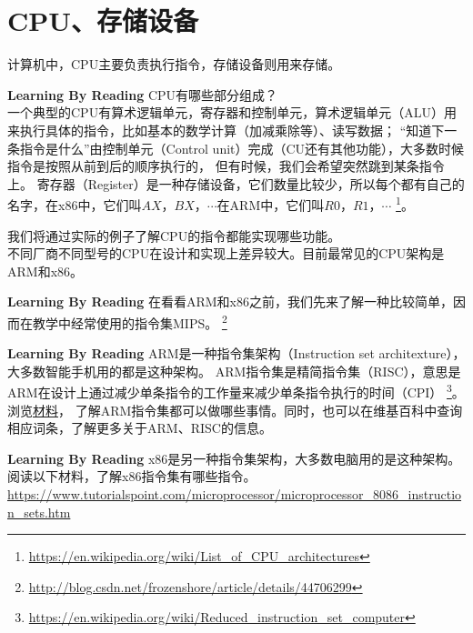 \section{CPU、存储设备}
计算机中，CPU主要负责执行指令，存储设备则用来存储。\\
\begin{paperbox}{\textbf{Learning By Reading}\starthree}
CPU有哪些部分组成？\\
一个典型的CPU有算术逻辑单元，寄存器和控制单元，算术逻辑单元（ALU）用来执行具体的指令，比如基本的数学计算（加减乘除等）、读写数据；
“知道下一条指令是什么”由控制单元（Control unit）完成（CU还有其他功能），大多数时候指令是按照从前到后的顺序执行的，
但有时候，我们会希望突然跳到某条指令上。
寄存器（Register）是一种存储设备，它们数量比较少，所以每个都有自己的名字，在x86中，它们叫$AX$，$BX$，$\cdots$在ARM中，它们叫$R0$，$R1$，$\cdots$
\footnote{\url{https://en.wikipedia.org/wiki/List_of_CPU_architectures}}。
\end{paperbox}
我们将通过实际的例子了解CPU的指令都能实现哪些功能。\\
不同厂商不同型号的CPU在设计和实现上差异较大。目前最常见的CPU架构是ARM和x86。
\begin{paperbox}{\textbf{Learning By Reading}\starthree}
在看看ARM和x86之前，我们先来了解一种比较简单，因而在教学中经常使用的指令集MIPS。
\footnote{\url{http://blog.csdn.net/frozenshore/article/details/44706299}}
\end{paperbox}
\begin{paperbox}{\textbf{Learning By Reading}\starone}
ARM是一种指令集架构（Instruction set architexture），大多数智能手机用的都是这种架构。
ARM指令集是精简指令集（RISC），意思是ARM在设计上通过减少单条指令的工作量来减少单条指令执行的时间（CPI）
\footnote{\url{https://en.wikipedia.org/wiki/Reduced_instruction_set_computer}}。
浏览\href{http://infocenter.arm.com/help/topic/com.arm.doc.qrc0006ec/QRC0006_UAL16.pdf}{材料}，
了解ARM指令集都可以做哪些事情。同时，也可以在维基百科中查询相应词条，了解更多关于ARM、RISC的信息。\\
\end{paperbox}
\begin{paperbox}{\textbf{Learning By Reading}\starone}
x86是另一种指令集架构，大多数电脑用的是这种架构。
阅读以下材料，了解x86指令集有哪些指令。\\
\url{https://www.tutorialspoint.com/microprocessor/microprocessor_8086_instruction_sets.htm}
\end{paperbox}
